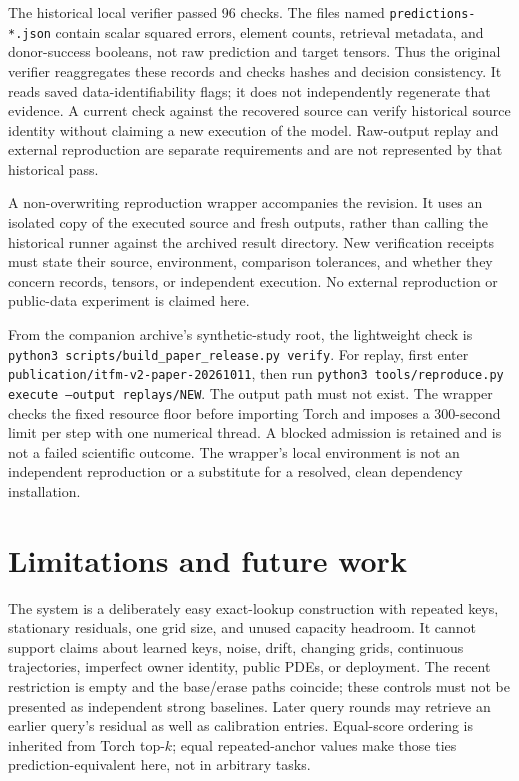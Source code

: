 \documentclass[11pt]{article}
\begin{document}
The historical local verifier passed 96 checks. The files named
\texttt{predictions-*.json} contain scalar squared errors, element counts,
retrieval metadata, and donor-success booleans, not raw prediction and target
tensors. Thus the original verifier reaggregates these records and checks
hashes and decision consistency. It reads saved data-identifiability flags;
it does not independently regenerate that evidence. A current check against
the recovered source can verify historical source identity without claiming
a new execution of the model. Raw-output replay and external reproduction
are separate requirements and are not represented by that historical pass.

A non-overwriting reproduction wrapper accompanies the revision. It uses an
isolated copy of the executed source and fresh outputs, rather than calling
the historical runner against the archived result directory. New verification
receipts must state their source, environment, comparison tolerances, and
whether they concern records, tensors, or independent execution. No external
reproduction or public-data experiment is claimed here.

From the companion archive's synthetic-study root, the lightweight check is
\texttt{python3 scripts/build\_paper\_release.py verify}. For replay, first
enter \texttt{publication/itfm-v2-paper-20261011}, then run
\texttt{python3 tools/reproduce.py execute --output replays/NEW}.
The output path must not exist. The wrapper checks the fixed resource floor
before importing Torch and imposes a 300-second limit per step with one
numerical thread. A blocked admission is retained and is not a failed
scientific outcome. The wrapper's local environment is not an independent
reproduction or a substitute for a resolved, clean dependency installation.

\section{Limitations and future work}
The system is a deliberately easy exact-lookup construction with repeated
keys, stationary residuals, one grid size, and unused capacity headroom. It
cannot support claims about learned keys, noise, drift, changing grids,
continuous trajectories, imperfect owner identity, public PDEs, or deployment.
The recent restriction is empty and the base/erase paths coincide; these
controls must not be presented as independent strong baselines. Later query
rounds may retrieve an earlier query's residual as well as calibration entries.
Equal-score ordering is inherited from Torch top-$k$; equal repeated-anchor
values make those ties prediction-equivalent here, not in arbitrary tasks.
\end{document}
